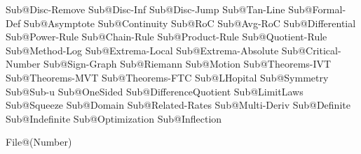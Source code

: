 Sub@Disc-Remove 			%
Sub@Disc-Inf				%
Sub@Disc-Jump				%
Sub@Tan-Line				%
Sub@Formal-Def				%
Sub@Asymptote				%
Sub@Continuity				%
Sub@RoC						%
Sub@Avg-RoC					%
Sub@Differential			%
Sub@Power-Rule				%
Sub@Chain-Rule				%
Sub@Product-Rule			%
Sub@Quotient-Rule			%
Sub@Method-Log				%
Sub@Extrema-Local			%
Sub@Extrema-Absolute		%
Sub@Critical-Number			%
Sub@Sign-Graph				%
Sub@Riemann					%
Sub@Motion					%
Sub@Theorems-IVT			%
Sub@Theorems-MVT			%
Sub@Theorems-FTC			%
Sub@LHopital				%
Sub@Symmetry				%
Sub@Sub-u					%
Sub@OneSided				%
Sub@DifferenceQuotient		%
Sub@LimitLaws				%
Sub@Squeeze					%
Sub@Domain					%
Sub@Related-Rates			%
Sub@Multi-Deriv				%
Sub@Definite				%
Sub@Indefinite				%
Sub@Optimization			%
Sub@Inflection				%







File@(Number) %





